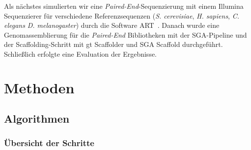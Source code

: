 \documentclass[a4paper,11pt,parskip]{scrartcl}
\begin{document}
Als nächstes simulierten wir eine \textit{Paired-End}-Sequenzierung mit
einem Illumina Sequenzierer für verschiedene Referenzsequenzen
(\textit{S. cerevisiae}, \textit{H. sapiens}, \textit{C. elegans}
 \textit{D. melanogaster}) durch die Software ART~\cite{Huang:2012kq}.
Danach wurde eine Genomassemblierung für die \textit{Paired-End}
Bibliotheken mit der SGA-Pipeline und der Scaffolding-Schritt
mit gt Scaffolder und SGA Scaffold durchgeführt. Schließlich erfolgte
eine Evaluation der Ergebnisse.

\section{Methoden}
\label{sec: Methoden}

\subsection{Algorithmen}
\subsubsection{Übersicht der Schritte}
\end{document}
